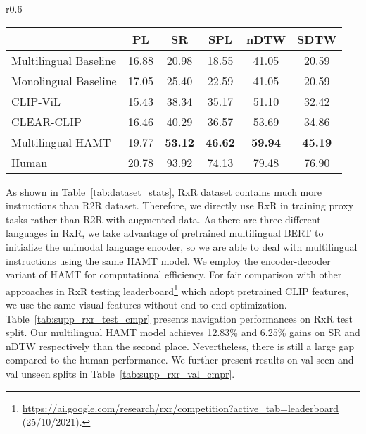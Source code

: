 \begin{wraptable}{r}{0.6\textwidth}
\centering
\small
\tabcolsep=0.1cm
\vspace{-1em}
\caption{Navigation performance on RxR test split.}
\label{tab:supp_rxr_test_cmpr}
\begin{tabular}{lccccc} \toprule
 & PL & SR & SPL & nDTW & SDTW \\ \midrule
Multilingual Baseline \cite{ku2020room} & 16.88 & 20.98 & 18.55 & 41.05 & 20.59 \\
Monolingual Baseline \cite{ku2020room} & 17.05 & 25.40 & 22.59 & 41.05 & 20.59 \\
CLIP-ViL & 15.43 & 38.34 & 35.17 & 51.10 & 32.42 \\
CLEAR-CLIP & 16.46 & 40.29 & 36.57 & 53.69 & 34.86 \\
Multilingual HAMT & 19.77 & \textbf{53.12} & \textbf{46.62} & \textbf{59.94} & \textbf{45.19} \\ \midrule
Human & 20.78 & 93.92 & 74.13 & 79.48 & 76.90 \\ \bottomrule
\end{tabular}
\end{wraptable}

As shown in Table~\ref{tab:dataset_stats}, RxR dataset contains much more instructions than R2R dataset. Therefore, we directly use RxR in training proxy tasks rather than R2R with augmented data.
As there are three different languages in RxR, we take advantage of pretrained multilingual BERT \cite{conneau2020unsupervised} to initialize the unimodal language encoder, so we are able to deal with multilingual instructions using the same HAMT model.
We employ the encoder-decoder variant of HAMT for computational efficiency.
For fair comparison with other approaches in RxR testing leaderboard\footnote{\url{https://ai.google.com/research/rxr/competition?active_tab=leaderboard} (25/10/2021).} which adopt pretrained CLIP \cite{radford2021learning} features, we use the same visual features without end-to-end optimization.
Table~\ref{tab:supp_rxr_test_cmpr} presents navigation performances on RxR test split. Our multilingual HAMT model achieves 12.83\% and 6.25\% gains on SR and nDTW respectively than the second place. Nevertheless, there is still a large gap compared to the human performance.
We further present results on val seen and val unseen splits in Table~\ref{tab:supp_rxr_val_cmpr}.

